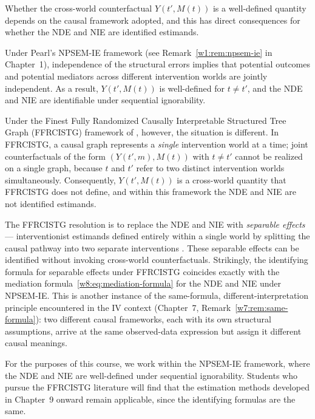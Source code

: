 \documentclass[master.tex]{subfiles}
\begin{document}
\begin{remark}
\label{w8:rem:ffrcistg}
Whether the cross-world counterfactual $Y(t', M(t))$ is a well-defined
quantity depends on the causal framework adopted, and this has direct
consequences for whether the NDE and NIE are identified estimands.

Under Pearl's NPSEM-IE framework (see Remark~\ref{w1:rem:npsem-ie} in
Chapter~1), independence of the structural errors implies that potential
outcomes and potential mediators across different intervention worlds are
jointly independent.  As a result, $Y(t', M(t))$ is well-defined for
$t \neq t'$, and the NDE and NIE are identifiable under sequential
ignorability.

Under the Finest Fully Randomized Causally Interpretable Structured
Tree Graph (FFRCISTG) framework of \citet{richardson2014ace}, however,
the situation is different.  In FFRCISTG, a causal graph represents a
\emph{single} intervention world at a time; joint counterfactuals of
the form $(Y(t', m), M(t))$ with $t \neq t'$ cannot be realized on a
single graph, because $t$ and $t'$ refer to two distinct intervention
worlds simultaneously.  Consequently, $Y(t', M(t))$ is a cross-world
quantity that FFRCISTG does not define, and within this framework the
NDE and NIE are not identified estimands.

The FFRCISTG resolution is to replace the NDE and NIE with
\emph{separable effects} --- interventionist estimands defined entirely
within a single world by splitting the causal pathway into two
separate interventions \citep{stensrud2022separable,
stensrud2023generalized}.  These separable effects can be identified
without invoking cross-world counterfactuals.  Strikingly, the
identifying formula for separable effects under FFRCISTG coincides
exactly with the mediation formula~\eqref{w8:eq:mediation-formula} for
the NDE and NIE under NPSEM-IE.  This is another instance of the
same-formula, different-interpretation principle encountered in the IV
context (Chapter~7, Remark~\ref{w7:rem:same-formula}): two different
causal frameworks, each with its own structural assumptions, arrive at
the same observed-data expression but assign it different causal
meanings.

For the purposes of this course, we work within the NPSEM-IE framework,
where the NDE and NIE are well-defined under sequential ignorability.
Students who pursue the FFRCISTG literature will find that the
estimation methods developed in Chapter~9 onward remain applicable,
since the identifying formulas are the same.
\end{remark}
\end{document}
